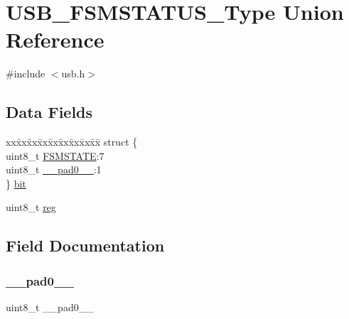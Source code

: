 \hypertarget{union_u_s_b___f_s_m_s_t_a_t_u_s___type}{}\section{U\+S\+B\+\_\+\+F\+S\+M\+S\+T\+A\+T\+U\+S\+\_\+\+Type Union Reference}
\label{union_u_s_b___f_s_m_s_t_a_t_u_s___type}


{\ttfamily \#include $<$usb.\+h$>$}

\subsection*{Data Fields}
\begin{DoxyCompactItemize}
\item 
\begin{tabbing}
xx\=xx\=xx\=xx\=xx\=xx\=xx\=xx\=xx\=\kill
struct \{\\
\>uint8\_t \mbox{\hyperlink{union_u_s_b___f_s_m_s_t_a_t_u_s___type_a9132a0e973699d58e0fde3995c79324f}{FSMSTATE}}:7\\
\>uint8\_t \mbox{\hyperlink{union_u_s_b___f_s_m_s_t_a_t_u_s___type_a8b4eebe79ded0459acec2f4950102ba3}{\_\_pad0\_\_}}:1\\
\} \mbox{\hyperlink{union_u_s_b___f_s_m_s_t_a_t_u_s___type_a4977bb0068087305ad7a5d58497a6138}{bit}}\\

\end{tabbing}\item 
uint8\+\_\+t \mbox{\hyperlink{union_u_s_b___f_s_m_s_t_a_t_u_s___type_a9428adc9af4653a2050e2536b55dec8d}{reg}}
\end{DoxyCompactItemize}


\subsection{Field Documentation}
\mbox{\label{union_u_s_b___f_s_m_s_t_a_t_u_s___type_a8b4eebe79ded0459acec2f4950102ba3}} 
\subsubsection{\texorpdfstring{\_\_pad0\_\_}{\_\_pad0\_\_}}
{\footnotesize\ttfamily uint8\+\_\+t \+\_\+\+\_\+pad0\+\_\+\+\_\+}

